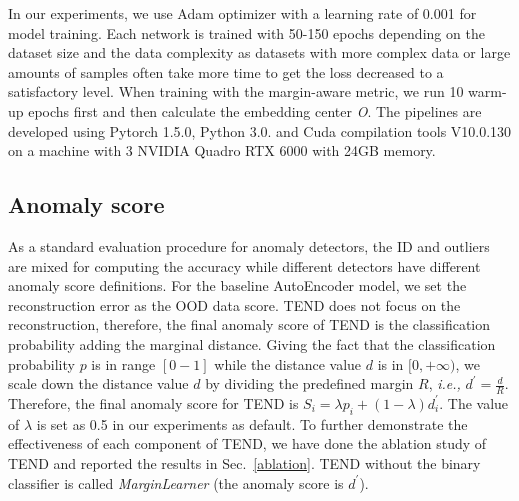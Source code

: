 \documentclass[12pt]{spieman}  %
\begin{document}
\begin{spacing}{2}
In our experiments, we use Adam optimizer with a learning rate of 0.001 for model training. Each network is trained with 50-150 epochs depending on the dataset size and the data complexity as datasets with more complex data or large amounts of samples often take more time to get the loss decreased to a satisfactory level. When training with the margin-aware metric, we run 10 warm-up epochs first and then calculate the embedding center \textit{O}. The pipelines are developed using Pytorch 1.5.0, Python 3.0. and Cuda compilation tools V10.0.130 on a machine with 3 NVIDIA Quadro RTX 6000 with 24GB memory.


\subsection{Anomaly score}
As a standard evaluation procedure for anomaly detectors, the ID and outliers are mixed for computing the accuracy while different detectors have different anomaly score definitions. For the baseline AutoEncoder model, we set the reconstruction error as the OOD data score. TEND does not focus on the reconstruction, therefore, the final anomaly score of TEND is the classification probability adding the marginal distance. Giving the fact that the classification probability $p$ is in range $[0-1]$ while the distance value $d$ is in $[0,+\infty)$, we scale down the distance value $d$ by dividing the predefined margin $R$, \textit{i.e.,} $d^{'} ={\frac{d}{R}}$. Therefore, the final anomaly score for TEND is $S_{i}=\lambda p_{i}+(1-\lambda)d^{'}_{i}$. The value of $\lambda$ is set as 0.5 in our experiments as default. To further demonstrate the effectiveness of each component of TEND, we have done the ablation study of TEND and reported the results in Sec.~\ref{ablation}. TEND without the binary classifier is called \textit{MarginLearner} (the anomaly score is $d^{'}$). 


\end{spacing}
\end{document}
